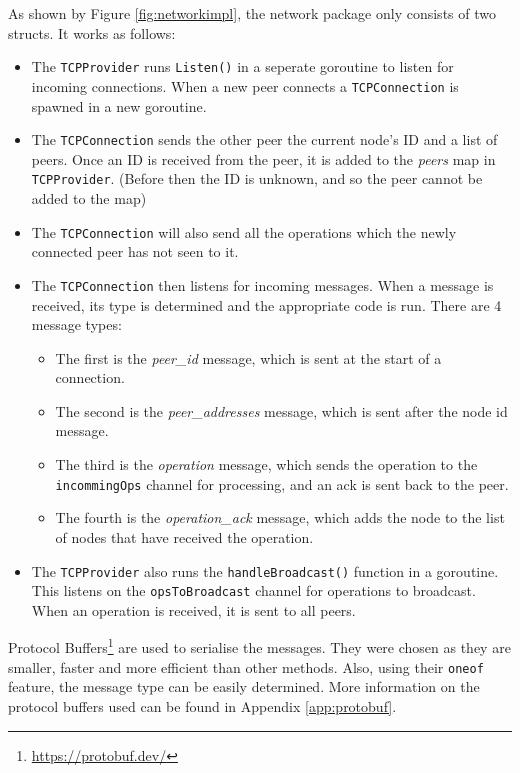 \documentclass[12pt]{report}
\begin{document}
As shown by Figure \ref{fig:networkimpl}, the network package only consists of two structs. It works as follows: 
\begin{itemize}
    \item The \texttt{TCPProvider} runs \texttt{Listen()} in a seperate goroutine to listen for incoming connections. When a new peer connects a \texttt{TCPConnection} is spawned in a new goroutine.
    \item The \texttt{TCPConnection} sends the other peer the current node's ID and a list of peers. Once an ID is received from the peer, it is added to the \textit{peers} map in \texttt{TCPProvider}. (Before then the ID is unknown, and so the peer cannot be added to the map)
    \item The \texttt{TCPConnection} will also send all the operations which the newly connected peer has not seen to it.
    \item The \texttt{TCPConnection} then listens for incoming messages. When a message is received, its type is determined and the appropriate code is run. There are 4 message types:
    \begin{itemize}
        \item The first is the \textit{peer\_id} message, which is sent at the start of a connection. 
        \item The second is the \textit{peer\_addresses} message, which is sent after the node id message. 
        \item The third is the \textit{operation} message, which sends the operation to the \texttt{incommingOps} channel for processing, and an ack is sent back to the peer.
        \item The fourth is the \textit{operation\_ack} message, which adds the node to the list of nodes that have received the operation.
    \end{itemize} 
    \item The \texttt{TCPProvider} also runs the \texttt{handleBroadcast()} function in a goroutine. This listens on the \texttt{opsToBroadcast} channel for operations to broadcast. When an operation is received, it is sent to all peers. 
\end{itemize}
Protocol Buffers\footnote{\url{https://protobuf.dev/}} are used to serialise the messages. They were chosen as they are smaller, faster and more efficient than other methods. Also, using their \texttt{oneof} feature, the message type can be easily determined. More information on the protocol buffers used can be found in Appendix \ref{app:protobuf}. \par
\end{document}

